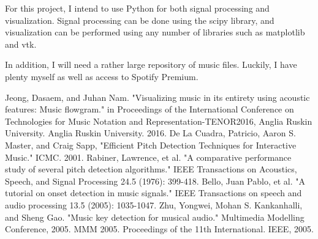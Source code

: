 \documentclass[12pt, a4paper]{article}
\begin{document}
For this project, I intend to use Python for both signal processing and
visualization. Signal processing can be done using the scipy library, and
visualization can be performed using any number of libraries such as
matplotlib and vtk.

In addition, I will need a rather large repository of music files. Luckily,
I have plenty myself as well as access to Spotify Premium.

\begin{thebibliography}{9}
 Jeong, Dasaem, and Juhan Nam. "Visualizing music in its entirety
using acoustic features: Music flowgram." in Proceedings of the International
Conference on Technologies for Music Notation and Representation-TENOR2016,
Anglia Ruskin University. Anglia Ruskin University. 2016.
 De La Cuadra, Patricio, Aaron S. Master, and Craig Sapp,
"Efficient Pitch Detection Techniques for Interactive Music." ICMC. 2001.
 Rabiner, Lawrence, et al. "A comparative performance study of several
pitch detection algorithms." IEEE Transactions on Acoustics, Speech, and Signal
Processing 24.5 (1976): 399-418.
 Bello, Juan Pablo, et al. "A tutorial on onset detection in
music signals." IEEE Transactions on speech and audio processing 13.5 (2005):
1035-1047.
 Zhu, Yongwei, Mohan S. Kankanhalli, and Sheng Gao. "Music key
detection for musical audio." Multimedia Modelling Conference, 2005. MMM 2005.
Proceedings of the 11th International. IEEE, 2005.
\end{thebibliography}
\end{document}
